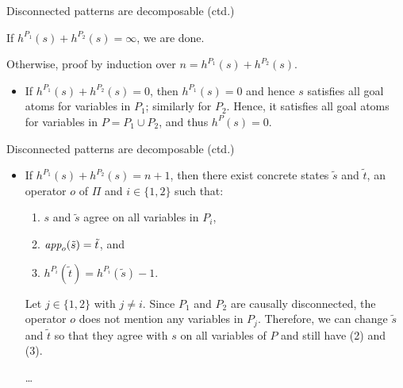 \documentclass{gkibeamer}
\begin{document}
\begin{frame}{Disconnected patterns are decomposable (ctd.)}
  \begin{proofmid}
    \hilite{$(\ge)$:} If $h^{P_1}(s) + h^{P_2}(s) = \infty$, we are
    done.

    Otherwise, proof by induction over $n = h^{P_1}(s) + h^{P_2}(s)$.
    \begin{itemize}
    \item {}

      If $h^{P_1}(s) + h^{P_2}(s) = 0$,
      then $h^{P_1}(s) = 0$ and hence $s$ satisfies all goal atoms for
      variables in $P_1$; similarly for $P_2$. Hence, it satisfies all
      goal atoms for variables in $P = P_1 \cup P_2$, and thus
      $h^P(s) = 0$.
    \end{itemize}
  \end{proofmid}
\end{frame}

\begin{frame}{Disconnected patterns are decomposable (ctd.)}
  \begin{proofmid}
    \begin{itemize}
    \item {}

      If $h^{P_1}(s) + h^{P_2}(s) = n+1$, then there exist concrete
      states $\tilde{s}$ and $\tilde{t}$, an operator $o$ of $\Pi$ and
      $i \in \{1, 2\}$ such that:
      \begin{enumerate}
      \item $s$ and $\tilde{s}$ agree on all variables in $P_i$,
      \item $\textit{app}_{o}(\tilde{s}) = \tilde{t}$, and
      \item $h^{P_i}(\tilde{t}) = h^{P_i}(\tilde{s}) - 1$.
      \end{enumerate}

      \pause

      Let $j \in \{1, 2\}$ with $j \neq i$. Since $P_1$ and $P_2$ are
      causally disconnected, the operator $o$ does not mention any
      variables in $P_j$. Therefore, we can change $\tilde{s}$ and
      $\tilde{t}$ so that they agree with $s$ on all variables of
      $P$ and still have (2) and (3).

      \dots
    \end{itemize}
  \end{proofmid}
\end{frame}
\end{document}
